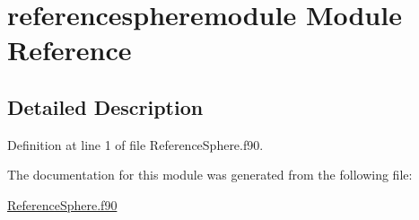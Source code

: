 \hypertarget{classreferencespheremodule}{\section{referencespheremodule Module Reference}
\label{classreferencespheremodule}
}


\subsection{Detailed Description}


Definition at line 1 of file Reference\+Sphere.\+f90.



The documentation for this module was generated from the following file\+:\begin{DoxyCompactItemize}
\item 
\hyperlink{ReferenceSphere_8f90}{Reference\+Sphere.\+f90}\end{DoxyCompactItemize}
